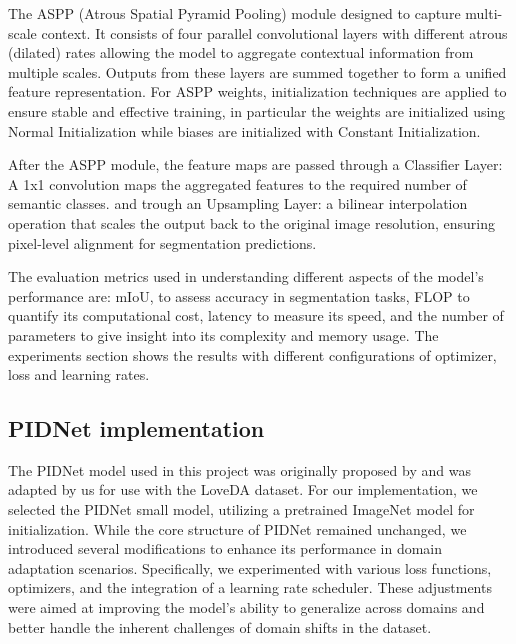 \documentclass[10pt,twocolumn,letterpaper]{article}
\begin{document}
The ASPP (Atrous Spatial Pyramid Pooling) module designed to capture multi-scale context. It consists of four parallel convolutional layers with different atrous (dilated) rates allowing the model to aggregate contextual information from multiple scales. Outputs from these layers are summed together to form a unified feature representation.
For ASPP weights, initialization techniques are applied to ensure stable and effective training, in particular the weights are initialized using Normal Initialization while biases are initialized with Constant Initialization.


After the ASPP module, the feature maps are passed through a Classifier Layer: A 1x1 convolution maps the aggregated features to the required number of semantic classes.
and trough an Upsampling Layer: a bilinear interpolation operation that scales the output back to the original image resolution, ensuring pixel-level alignment for segmentation predictions.


The evaluation metrics used in understanding different aspects of the model's performance are: mIoU, to assess accuracy in segmentation tasks, FLOP to quantify its computational cost, latency to measure its speed, and the number of parameters to give insight into its complexity and memory usage. The experiments section shows the results with different configurations of optimizer, loss and learning rates. 


\subsection{PIDNet implementation}

The PIDNet model used in this project was originally proposed by \cite{feng2021pidnet} and was adapted by us for use with the LoveDA dataset. For our implementation, we selected the PIDNet small model, utilizing a pretrained ImageNet model for initialization. While the core structure of PIDNet remained unchanged, we introduced several modifications to enhance its performance in domain adaptation scenarios. Specifically, we experimented with various loss functions, optimizers, and the integration of a learning rate scheduler. These adjustments were aimed at improving the model's ability to generalize across domains and better handle the inherent challenges of domain shifts in the dataset.
\end{document}
